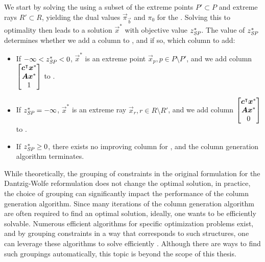 We start by solving the \RMP{} using a subset of the extreme points $P' \subset P$ and extreme rays $R' \subset R$, yielding the dual values $\vec{\pi}_\vec{b}$ and $\pi_0$ for the \SP{}. Solving this \SP{} to optimality then leads to a solution $\vec{x}^*$ with objective value $z^*_\SP{}$. The value of $z^*_\SP{}$ determines whether we add a column to \RMP{}, and if so, which column to add:

\begin{itemize}
\item If $-\infty < z^*_\SP{} < 0$, $\vec{x}^*$ is an extreme point $\vec{x}_p, p \in P \setminus P'$, and we add column $\begin{bmatrix} {\bm{c}}^\intercal {\bm{x}}^* \\ {\bm{A}} {\bm{x}}^* \\ 1 \end{bmatrix}$ to \RMP{}.
\item If $z^*_\SP{} = -\infty$, $\vec{x}^*$ is an extreme ray $\vec{x}_r, r \in R \setminus R'$, and we add column $\begin{bmatrix} {\bm{c}}^\intercal {\bm{x}}^* \\ {\bm{A}} {\bm{x}}^* \\ 0 \end{bmatrix}$ to \RMP{}.
\item If $z^*_\SP{} \geq 0$, there exists no improving column for \RMP{}, and the column generation algorithm terminates.
\end{itemize}

While theoretically, the grouping of constraints in the original \LP{} formulation for the Dantzig-Wolfe reformulation does not change the optimal solution, in practice, the choice of grouping can significantly impact the performance of the column generation algorithm. Since many iterations of the column generation algorithm are often required to find an optimal solution, ideally, one wants \SP{} to be efficiently solvable. Numerous efficient algorithms for specific optimization problems exist, and by grouping constraints in a way that \SP{} corresponds to such structures, one can leverage these algorithms to solve \SP{} efficiently \cite{thebook}. Although there are ways to find such groupings automatically, this topic is beyond the scope of this thesis.
